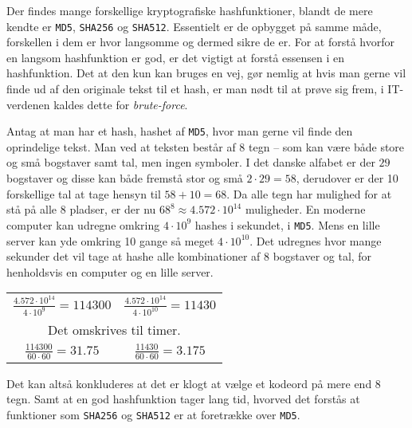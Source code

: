 Der findes mange forskellige kryptografiske hashfunktioner, blandt de mere kendte er \texttt{MD5}, \texttt{SHA256} og \texttt{SHA512}.
Essentielt er de opbygget på samme måde, forskellen i dem er hvor langsomme og dermed sikre de er.
For at forstå hvorfor en langsom hashfunktion er god, er det vigtigt at forstå essensen i en hashfunktion.
Det at den kun kan bruges en vej, gør nemlig at hvis man gerne vil finde ud af den originale tekst til et hash, er man nødt til at prøve sig frem, i IT-verdenen kaldes dette for \emph{brute-force}.


\begin{eks}
    Antag at man har et hash, hashet af \texttt{MD5}, hvor man gerne vil finde den oprindelige tekst.
    Man ved at teksten består af 8 tegn -- som kan være både store og små bogstaver samt tal, men ingen symboler.
    I det danske alfabet er der \(29\) bogstaver og disse kan både fremstå stor og små \(2 \cdot 29 = 58\), derudover er der 10 forskellige tal at tage hensyn til \(58 + 10 = 68\).
    Da alle tegn har mulighed for at stå på alle 8 pladser, er der nu \(68^8\approx 4.572 \cdot 10^{14}\) muligheder.
    En moderne computer kan udregne omkring \(4 \cdot 10^9\) hashes i sekundet, i \texttt{MD5}.
    Mens en lille server kan yde omkring 10 gange så meget \(4 \cdot 10^{10}\).\cite{ytpwd}
    Det udregnes hvor mange sekunder det vil tage at hashe alle kombinationer af 8 bogstaver og tal, for henholdsvis en computer og en lille server.

    \setlength{\tabcolsep}{50pt} %
    \begin{center}
        \begin{tabular}{c c}

            \(\frac{4.572 \cdot 10^{14}}{4 \cdot 10^9} = 114300\) &
            \(\frac{4.572 \cdot 10^{14}}{4 \cdot 10^{10}} = 11430\)\\

            \multicolumn{2}{c}{Det omskrives til timer.}\\

            \(\frac{114300}{60 \cdot 60} = 31.75\) &
            \(\frac{11430}{60 \cdot 60} = 3.175\)\\

        \end{tabular}
    \end{center}

    \noindent
    Det kan altså konkluderes at det er klogt at vælge et kodeord på mere end 8 tegn.
    Samt at en god hashfunktion tager lang tid, hvorved det forstås at funktioner som \texttt{SHA256} og \texttt{SHA512} er at foretrække over \texttt{MD5}.

\end{eks}


